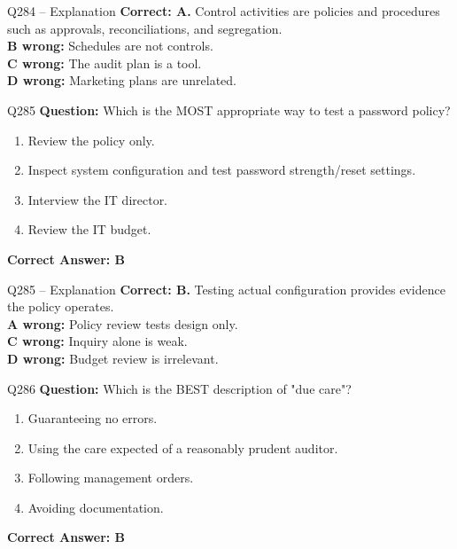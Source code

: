 \documentclass[aspectratio=169,10pt]{beamer}
\begin{document}
	\begin{frame}[t]{Q284 -- Explanation}
		\small
		\textbf{Correct: A.} Control activities are policies and procedures such as approvals, reconciliations, and segregation. \\[4pt]
		\textbf{B wrong:} Schedules are not controls. \\[2pt]
		\textbf{C wrong:} The audit plan is a tool. \\[2pt]
		\textbf{D wrong:} Marketing plans are unrelated.
	\end{frame}
	
	\begin{frame}[t]{Q285}
		\small
		\textbf{Question:} Which is the MOST appropriate way to test a password policy?
		\begin{enumerate}[label=\Alph*.,itemsep=1pt,topsep=2pt]
			\item Review the policy only.
			\item Inspect system configuration and test password strength/reset settings.
			\item Interview the IT director.
			\item Review the IT budget.
		\end{enumerate}
		\vspace{4pt}
		\textbf{Correct Answer: B}
	\end{frame}
	
	\begin{frame}[t]{Q285 -- Explanation}
		\small
		\textbf{Correct: B.} Testing actual configuration provides evidence the policy operates. \\[4pt]
		\textbf{A wrong:} Policy review tests design only. \\[2pt]
		\textbf{C wrong:} Inquiry alone is weak. \\[2pt]
		\textbf{D wrong:} Budget review is irrelevant.
	\end{frame}
	
	\begin{frame}[t]{Q286}
		\small
		\textbf{Question:} Which is the BEST description of "due care"?
		\begin{enumerate}[label=\Alph*.,itemsep=1pt,topsep=2pt]
			\item Guaranteeing no errors.
			\item Using the care expected of a reasonably prudent auditor.
			\item Following management orders.
			\item Avoiding documentation.
		\end{enumerate}
		\vspace{4pt}
		\textbf{Correct Answer: B}
	\end{frame}
	
\end{document}

